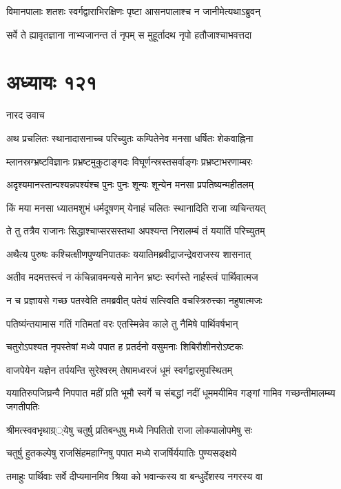 \twolineshloka
{विमानपालाः शतशः स्वर्गद्वाराभिरक्षिणः}
{पृष्टा आसनपालाश्च न जानीमेत्यथाऽब्रुवन्}


\twolineshloka
{सर्वे ते ह्यावृतज्ञाना नाभ्यजानन्त तं नृपम्}
{स मुहूर्तादथ नृपो हतौजाश्चाभवत्तदा}


\chapter{अध्यायः १२१}
\twolineshloka
{नारद उवाच}
{}


\twolineshloka
{अथ प्रचलितः स्थानादासनाच्च परिच्युतः}
{कम्पितेनेव मनसा धर्षितः शेकवाह्निना}


\twolineshloka
{म्लानस्रग्भ्रष्टविज्ञानः प्रभ्रष्टमुकुटाङ्गदः}
{विघूर्णन्स्रस्तसर्वाङ्गः प्रभ्रष्टाभरणाम्बरः}


\twolineshloka
{अदृश्यमानस्तान्पश्यन्नपश्यंश्च पुनः पुनः}
{शून्यः शून्येन मनसा प्रपतिष्यन्महीतलम्}


\twolineshloka
{किं मया मनसा ध्यातमशुभं धर्मदूषणम्}
{येनाहं चलितः स्थानादिति राजा व्यचिन्तयत्}


\twolineshloka
{ते तु तत्रैव राजानः सिद्धाश्चाप्सरसस्तथा}
{अपश्यन्त निरालम्बं तं ययातिं परिच्युतम्}


\twolineshloka
{अथैत्य पुरुषः कश्चित्क्षीणपुण्यनिपातकः}
{ययातिमब्रवीद्राजन्द्रेवराजस्य शासनात्}


\twolineshloka
{अतीव मदमत्तस्त्वं न कंचिन्नावमन्यसे}
{मानेन भ्रष्टः स्वर्गस्ते नार्हस्त्वं पार्थिवात्मज}


\twolineshloka
{न च प्रज्ञायसे गच्छ पतस्वेति तमब्रवीत्}
{पतेयं सत्स्विति वचस्त्रिरुत्त्का नहुषात्मजः}


\twolineshloka
{पतिष्यंन्तयामास गतिं गतिमतां वरः}
{एतस्मिन्नेव काले तु नैमिषे पार्थिवर्षभान्}


\twolineshloka
{चतुरोऽपश्यत नृपस्तेषां मध्ये पपात ह}
{प्रतर्दनो वसुमनाः शिबिरौशीनरोऽष्टकः}


\twolineshloka
{वाजपेयेन यज्ञेन तर्पयन्ति सुरेश्वरम्}
{तेषामध्वरजं धूमं स्वर्गद्वारमुपस्थितम्}


\threelineshloka
{ययातिरुपजिघ्रन्वै निपपात महीं प्रति}
{भूमौ स्वर्गे च संबद्धां नदीं धूममयीमिव}
{गङ्गां गामिव गच्छन्तीमालम्ब्य जगतीपतिः}


\twolineshloka
{श्रीमत्स्ववभृथाग्र््येषु चतुर्षु प्रतिबन्धुषु}
{मध्ये निपतितो राजा लोकपालोपमेषु सः}


\twolineshloka
{चतुर्षु हुतकल्पेषु राजसिंहमहाग्निषु}
{पपात मध्ये राजर्षिर्ययातिः पुण्यसङ्क्षये}


\twolineshloka
{तमाहुः पार्थिवाः सर्वे दीप्यमानमिव श्रिया}
{को भवान्कस्य वा बन्धुर्देशस्य नगरस्य वा}


